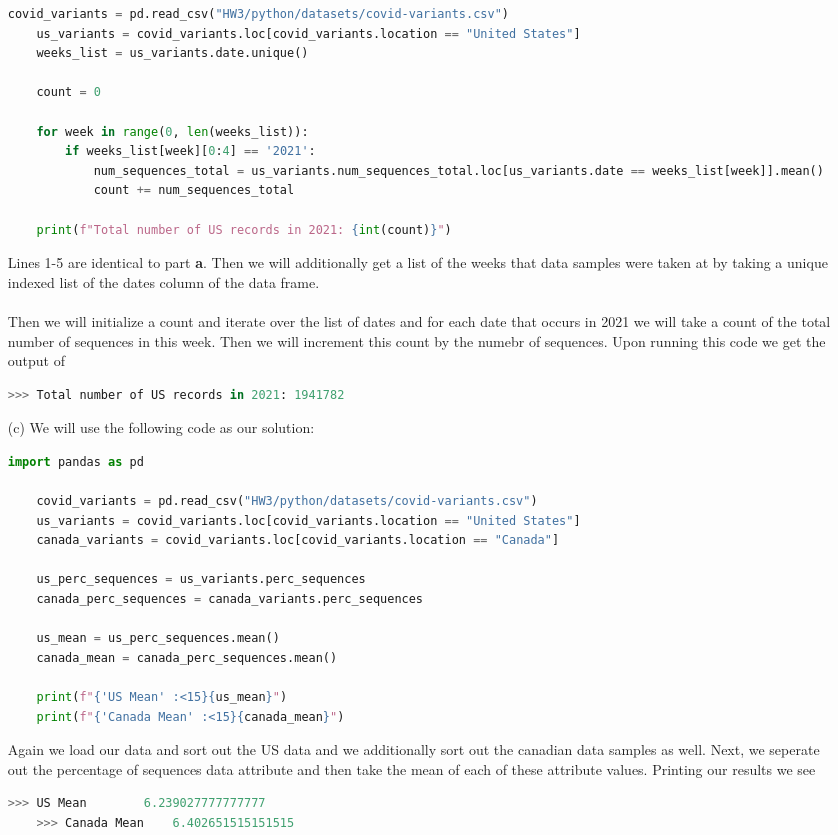 \documentclass[12pt, letterpaper]{article}
\begin{document}
\begin{enumerate}
\begin{lstlisting}[language = python]
    covid_variants = pd.read_csv("HW3/python/datasets/covid-variants.csv")
    us_variants = covid_variants.loc[covid_variants.location == "United States"]
    weeks_list = us_variants.date.unique()

    count = 0

    for week in range(0, len(weeks_list)):
        if weeks_list[week][0:4] == '2021':
            num_sequences_total = us_variants.num_sequences_total.loc[us_variants.date == weeks_list[week]].mean()
            count += num_sequences_total

    print(f"Total number of US records in 2021: {int(count)}")
\end{lstlisting}
    Lines 1-5 are identical to part {\bf a}. Then we will additionally get a list 
    of the weeks that data samples were taken at by taking a unique indexed list of the 
    dates column of the data frame. \\ \\ 
    Then we will initialize a count and iterate over the list of dates and for 
    each date that occurs in 2021 we will take a count of the total number 
    of sequences in this week. Then we will increment this count by the numebr of 
    sequences. Upon running this code we get the output of 
\begin{lstlisting}[language = python]
    >>> Total number of US records in 2021: 1941782
\end{lstlisting}
\newpage
    \item [(c)] We will use the following code as our solution: 
\begin{lstlisting}[language=python]
    import pandas as pd

    covid_variants = pd.read_csv("HW3/python/datasets/covid-variants.csv")
    us_variants = covid_variants.loc[covid_variants.location == "United States"]
    canada_variants = covid_variants.loc[covid_variants.location == "Canada"]

    us_perc_sequences = us_variants.perc_sequences
    canada_perc_sequences = canada_variants.perc_sequences

    us_mean = us_perc_sequences.mean()
    canada_mean = canada_perc_sequences.mean()

    print(f"{'US Mean' :<15}{us_mean}")
    print(f"{'Canada Mean' :<15}{canada_mean}")
\end{lstlisting}
    Again we load our data and sort out the US data and we additionally sort 
    out the canadian data samples as well. Next, we seperate out the percentage of 
    sequences data attribute and then take the mean of each of these attribute values. 
    Printing our results we see
\begin{lstlisting}[language = python]
    >>> US Mean        6.239027777777777
    >>> Canada Mean    6.402651515151515
\end{lstlisting}
\newpage


\end{enumerate}
\end{document}
